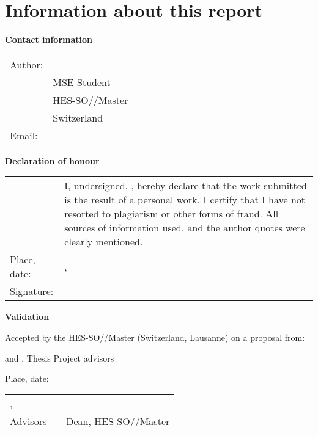 \chapter*{Information about this report}

\vspace{\fill}

\textbf{Contact information}

\begin{tabularx}{\textwidth}{N{2.5cm}X}
	Author:	 & \Author \\
	& MSE Student \\
	& HES-SO//Master \\
	& Switzerland \\
	Email: & \email{\AuthorEmail}
\end{tabularx}

\vspace{\fill}

\textbf{Declaration of honour}

{\renewcommand{\arraystretch}{2}
\begin{tabularx}{\textwidth}{N{2.5cm}X}
	& I, undersigned, \Author, hereby declare that the work submitted is 
	the result of a personal work. I certify that I have not resorted to 
	plagiarism or other forms of fraud. All sources of information used, and the 
	author quotes were clearly mentioned. \\
	Place, date: & \Place, \Date \\ 
	Signature: & \underline{\hspace{7cm}}
\end{tabularx}
}

\vspace{\fill}




\textbf{Validation}

Accepted by the HES-SO//Master (Switzerland, Lausanne) on a proposal from:

\vspace{0.5cm}

\AdvisorOne and \AdvisorTwo, Thesis Project advisors

\vspace{1cm}

Place, date: \underline{\hspace{8cm}}

\vspace{3cm}

{ \renewcommand{\arraystretch}{1.5}
\begin{tabularx}{\textwidth}{X X X}
	\AdvisorOne, \AdvisorTwo  & \Dean\\ 
	Advisors &   & Dean, HES-SO//Master\\
\end{tabularx}
}